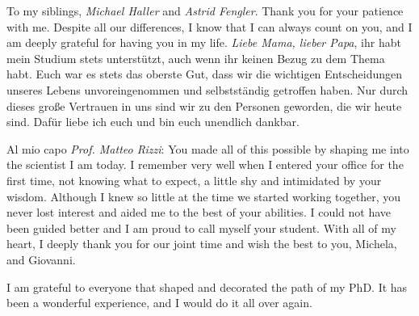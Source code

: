 To my siblings, {\it Michael Haller} and {\it Astrid Fengler}.
Thank you for your patience with me.
Despite all our differences, I know that I can always count on you, and I am deeply grateful for having you in my life.
{\it Liebe Mama, lieber Papa}, ihr habt mein Studium stets unterstützt, auch wenn ihr keinen Bezug zu dem Thema habt.
Euch war es stets das oberste Gut, dass wir die wichtigen Entscheidungen unseres Lebens unvoreingenommen und selbstständig getroffen haben.
Nur durch dieses große Vertrauen in uns sind wir zu den Personen geworden, die wir heute sind.
Dafür liebe ich euch und bin euch unendlich dankbar.

Al mio capo {\it Prof. Matteo Rizzi}:
You made all of this possible by shaping me into the scientist I am today.
I remember very well when I entered your office for the first time, not knowing what to expect, a little shy and intimidated by your wisdom.
Although I knew so little at the time we started working together, you never lost interest and aided me to the best of your abilities.
I could not have been guided better and I am proud to call myself your student.
With all of my heart, I deeply thank you for our joint time and wish the best to you, Michela, and Giovanni.

I am grateful to everyone that shaped and decorated the path of my PhD.
It has been a wonderful experience, and I would do it all over again.
